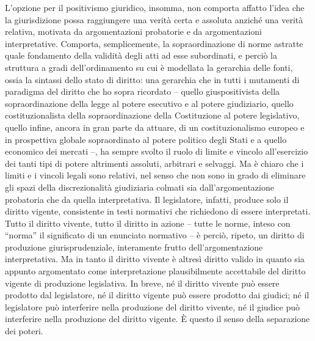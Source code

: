 L’opzione per il positivismo giuridico, insomma, non comporta affatto l’idea che la giurisdizione possa raggiungere una verità certa e assoluta anziché una verità relativa, motivata da argomentazioni probatorie e da argomentazioni interpretative. Comporta, semplicemente, la sopraordinazione di norme astratte quale fondamento della validità degli atti ad esse subordinati, e perciò la struttura a gradi dell’ordinamento su cui è modellata la gerarchia delle fonti, ossia la sintassi dello stato di diritto: una gerarchia che in tutti i mutamenti di paradigma del diritto che ho sopra ricordato – quello giuspositivista della sopraordinazione della legge al potere esecutivo e al potere giudiziario, quello costituzionalista della sopraordinazione della Costituzione al potere legislativo, quello infine, ancora in gran parte da attuare, di un costituzionalismo europeo e in prospettiva globale sopraordinato al potere politico degli Stati e a quello economico dei mercati –, ha sempre svolto il ruolo di limite e vincolo all’esercizio dei tanti tipi di potere altrimenti assoluti, arbitrari e selvaggi. Ma è chiaro che i limiti e i vincoli legali sono relativi, nel senso che non sono in grado di eliminare gli spazi della discrezionalità giudiziaria colmati sia dall’argomentazione probatoria che da quella interpretativa. Il legislatore, infatti, produce solo il diritto vigente, consistente in testi normativi che richiedono di essere interpretati. Tutto il diritto vivente, tutto il diritto in azione – tutte le norme, inteso con “norma” il significato di un enunciato normativo – è perciò, ripeto, un diritto di produzione giurisprudenziale, interamente frutto dell’argomentazione interpretativa. Ma in tanto il diritto vivente è altresì diritto valido in quanto sia appunto argomentato come interpretazione plausibilmente accettabile del diritto vigente di produzione legislativa. In breve, né il diritto vivente può essere prodotto dal legislatore, né il diritto vigente può essere prodotto dai giudici; né il legislatore può interferire nella produzione del diritto vivente, né il giudice può interferire nella produzione del diritto vigente. È questo il senso della separazione dei poteri.

